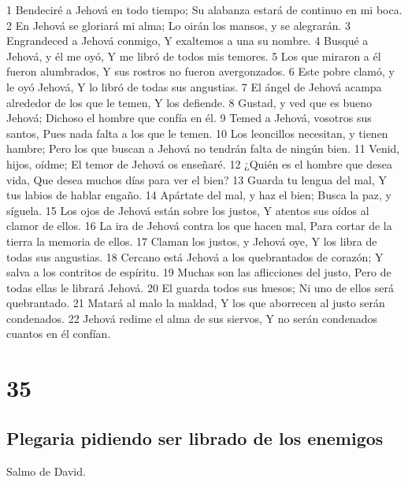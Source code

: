 1 Bendeciré a Jehová en todo tiempo;
Su alabanza estará de continuo en mi boca.
2 En Jehová se gloriará mi alma;
Lo oirán los mansos, y se alegrarán.
3 Engrandeced a Jehová conmigo,
Y exaltemos a una su nombre.
4 Busqué a Jehová, y él me oyó,
Y me libró de todos mis temores.
5 Los que miraron a él fueron alumbrados,
Y sus rostros no fueron avergonzados.
6 Este pobre clamó, y le oyó Jehová,
Y lo libró de todas sus angustias.
7 El ángel de Jehová acampa alrededor de los que le temen,
Y los defiende.
8 Gustad, y ved que es bueno Jehová;
Dichoso el hombre que confía en él.
9 Temed a Jehová, vosotros sus santos,
Pues nada falta a los que le temen.
10 Los leoncillos necesitan, y tienen hambre;
Pero los que buscan a Jehová no tendrán falta de ningún bien.
11 Venid, hijos, oídme;
El temor de Jehová os enseñaré.
12 ¿Quién es el hombre que desea vida,
Que desea muchos días para ver el bien?
13 Guarda tu lengua del mal,
Y tus labios de hablar engaño.
14 Apártate del mal, y haz el bien;
Busca la paz, y síguela.
15 Los ojos de Jehová están sobre los justos,
Y atentos sus oídos al clamor de ellos.
16 La ira de Jehová contra los que hacen mal,
Para cortar de la tierra la memoria de ellos.
17 Claman los justos, y Jehová oye,
Y los libra de todas sus angustias.
18 Cercano está Jehová a los quebrantados de corazón;
Y salva a los contritos de espíritu.
19 Muchas son las aflicciones del justo,
Pero de todas ellas le librará Jehová.
20 El guarda todos sus huesos;
Ni uno de ellos será quebrantado.
21 Matará al malo la maldad,
Y los que aborrecen al justo serán condenados.
22 Jehová redime el alma de sus siervos,
Y no serán condenados cuantos en él confían.

\chapter{35}

\section*{Plegaria pidiendo ser librado de los enemigos}

Salmo de David.

